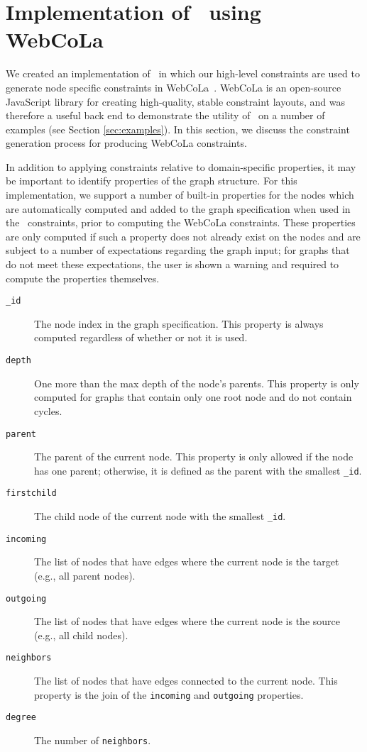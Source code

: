 \section{Implementation of \projectname~using WebCoLa}
We created an implementation of \projectname~in which our high-level
constraints are used to generate node specific constraints in
WebCoLa~\cite{WebCoLa}. WebCoLa is an open-source JavaScript library for
creating high-quality, stable constraint layouts, and was therefore a
useful back end to demonstrate the utility of \projectname~on a number of
examples (see Section \ref{sec:examples}). In this section, we discuss the
constraint generation process for producing WebCoLa constraints.


In addition to applying constraints relative to domain-specific properties,
it may be important to identify properties of the graph structure. For this
implementation, we support a number of built-in properties for the nodes
which are automatically computed and added to the graph specification when
used in the \projectname~constraints, prior to computing the WebCoLa
constraints. These properties are only computed if such a property does not
already exist on the nodes and are subject to a number of expectations
regarding the graph input; for graphs that do not meet these expectations,
the user is shown a warning and required to compute the properties
themselves.

\begin{description}
\item[\texttt{\_id}] The node index in the graph specification. This
  property is always computed regardless of whether or not it is used.
\item[\texttt{depth}] One more than the max depth of the node's
  parents. This property is only computed for graphs that contain only one
  root node and do not contain cycles.
\item[\texttt{parent}] The parent of the current node. This property is
  only allowed if the node has one parent; otherwise, it is defined as the
  parent with the smallest \texttt{\_id}.
\item[\texttt{firstchild}] The child node of the current node with the smallest \texttt{\_id}.
\item[\texttt{incoming}] The list of nodes that have edges where the
  current node is the target (e.g., all parent nodes).
\item[\texttt{outgoing}] The list of nodes that have edges where the
  current node is the source (e.g., all child nodes).
\item[\texttt{neighbors}] The list of nodes that have edges connected to
  the current node. This property is the join of the \texttt{incoming} and
  \texttt{outgoing} properties.
\item[\texttt{degree}] The number of \texttt{neighbors}.
\end{description}

